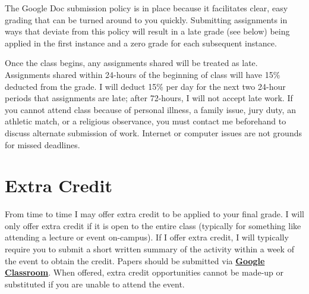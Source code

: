 \documentclass{tufte-book}
\begin{document}
\par The Google Doc submission policy is in place because it facilitates clear, easy grading that can be turned around to you quickly. Submitting assignments in ways that deviate from this policy will result in a late grade (see below) being applied in the first instance and a zero grade for each subsequent instance.

\par Once the class begins, any assignments shared will be treated as late. Assignments shared within 24-hours of the beginning of class will have 15\% deducted from the grade. I will deduct 15\% per day for the next two 24-hour periods that assignments are late; after 72-hours, I will not accept late work. If you cannot attend class because of personal illness, a family issue, jury duty, an athletic match, or a religious observance, you must contact me beforehand to discuss alternate submission of work. Internet or computer issues are not grounds for missed deadlines.

\vspace{3mm}
\section{Extra Credit}
From time to time I may offer extra credit to be applied to your final grade. I will only offer extra credit if it is open to the entire class (typically for something like attending a lecture or event on-campus). If I offer extra credit, I will typically require you to submit a short written summary of the activity within a week of the event to obtain the credit. Papers should be submitted via \textbf{\href{https://classroom.google.com}{Google Classroom}}. When offered, extra credit opportunities cannot be made-up or substituted if you are unable to attend the event.

\vspace{3mm}
\end{document}
